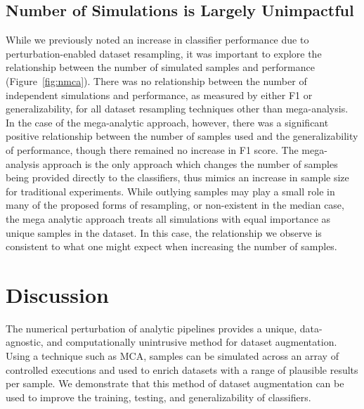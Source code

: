 \documentclass[10pt]{SelfArx} %
\begin{document}
\subsection*{Number of Simulations is Largely Unimpactful}

While we previously noted an increase in classifier performance due to perturbation-enabled dataset resampling, it was
important to explore the relationship between the number of simulated samples and performance (Figure~\ref{fig:nmca}).
There was no relationship between the number of independent simulations and performance, as measured by either F1 or
generalizability, for all dataset resampling techniques other than mega-analysis. In the case of the mega-analytic
approach, however, there was a significant positive relationship between the number of samples used and the
generalizability of performance, though there remained no increase in F1 score. The mega-analysis approach is the only
approach which changes the number of samples being provided directly to the classifiers, thus mimics an increase in
sample size for traditional experiments. While outlying samples may play a small role in many of the proposed forms of
resampling, or non-existent in the median case, the mega analytic approach treats all simulations with equal importance
as unique samples in the dataset. In this case, the relationship we observe is consistent to what one might expect when
increasing the number of samples.

\section*{Discussion}

The numerical perturbation of analytic pipelines provides a unique, data-agnostic, and computationally unintrusive
method for dataset augmentation. Using a technique such as MCA, samples can be simulated across an array of controlled
executions and used to enrich datasets with a range of plausible results per sample. We demonstrate that this method of
dataset augmentation can be used to improve the training, testing, and generalizability of classifiers.
\end{document}
